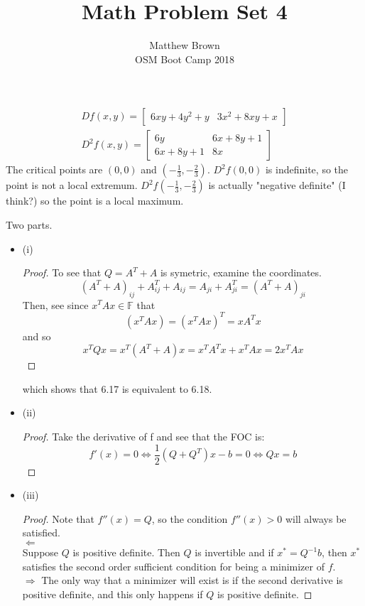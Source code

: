 \documentclass[12pt]{article}
\newenvironment{problem}[2][Problem]{\begin{trivlist}
\item[\hskip \labelsep {\bfseries #1}\hskip \labelsep {\bfseries #2.}]}{\end{trivlist}}
\theoremstyle{definition}
\theoremstyle{definition}
\theoremstyle{definition}
\theoremstyle{definition}
\begin{document}
\title{Math Problem Set 4}
\author{Matthew Brown\\ 
OSM Boot Camp 2018} %
 
\maketitle
 
\begin{problem}{6.6}
\end{problem}
\begin{align*}
Df(x, y) = \begin{bmatrix}
6xy +4y^2 + y & 3x^2 +8xy + x
\end{bmatrix} \\
D^2f(x, y) = \begin{bmatrix}
6y & 6x + 8y + 1 \\
6x + 8y + 1 & 8x
\end{bmatrix}
\end{align*}
The critical points are $(0,0)$ and $(-\frac{1}{3}, -\frac{2}{3})$. $D^2f(0, 0)$ is indefinite, so the point is not a local extremum. $D^2f(-\frac{1}{3}, -\frac{2}{3})$ is actually "negative definite" (I think?) so the point is a local maximum.

\begin{problem}{6.7} Two parts.
\begin{itemize}
\item (i) \begin{proof} To see that $Q = A^T+A$ is symetric, examine the coordinates.
$$
(A^T+A)_{ij} + A^T_{ij} + A_{ij} = A_{ji} + A^T_{ji} = (A^T+A)_{ji}
$$
Then, see since $x^TAx \in \mathbb{F}$ that 
$$
(x^TAx) = (x^TAx)^T = xA^Tx
$$
and so
$$
x^TQx = x^T(A^T+A)x = x^TA^Tx + x^TAx = 2x^TAx
$$
\end{proof}
which shows that 6.17 is equivalent to 6.18.
\item (ii)
\begin{proof}
Take the derivative of f and see that the FOC is:
$$
f'(x) = 0 \iff \frac{1}{2}(Q+Q^T)x - b = 0 \iff Qx = b
$$
\end{proof}
\item (iii)
\begin{proof}
Note that $f''(x) = Q$, so the condition $f''(x) > 0$ will always be satisfied. \\
$\Leftarrow$ \\ Suppose $Q$ is positive definite. Then $Q$ is invertible and if $x^* = Q^{-1}b$, then $x^*$ satisfies the second order sufficient condition for being a minimizer of $f$. \\
$\Rightarrow$ The only way that a minimizer will exist is if the second derivative is positive definite, and this only happens if $Q$ is positive definite.
\end{proof}
\end{itemize}
\end{problem}
\end{document}
